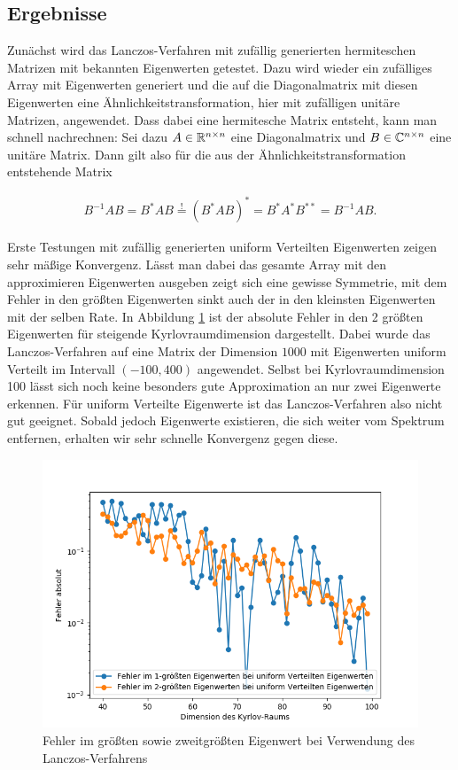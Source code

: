 \documentclass{article}
\theoremstyle{plain}
\begin{document}
\subsection{Ergebnisse}

Zunächst wird das Lanczos-Verfahren mit zufällig generierten hermiteschen Matrizen mit bekannten Eigenwerten getestet. Dazu wird wieder ein zufälliges Array mit Eigenwerten generiert und die auf die Diagonalmatrix mit diesen Eigenwerten eine Ähnlichkeitstransformation, hier mit zufälligen unitäre Matrizen, angewendet. Dass dabei eine hermitesche Matrix entsteht, kann man schnell nachrechnen: Sei dazu $A \in \mathbb{R}^{n\times n}$ eine Diagonalmatrix und $B \in \mathbb{C}^{n\times n}$ eine unitäre Matrix. Dann gilt also für die aus der Ähnlichkeitstransformation entstehende Matrix

\begin{align*}
	B^{-1}AB
	=
	B^* A B
	\stackrel{!}{=}
	(B^* A B)^*
	=
	B^* A^* B^{**}
	=
	B^{-1} A B.
\end{align*}

Erste Testungen mit zufällig generierten uniform Verteilten Eigenwerten zeigen sehr mäßige Konvergenz. Lässt man dabei das gesamte Array mit den approximieren Eigenwerten ausgeben zeigt sich eine gewisse Symmetrie, mit dem Fehler in den größten Eigenwerten sinkt auch der in den kleinsten Eigenwerten mit der selben Rate. In Abbildung \ref{error_uniform} ist der absolute Fehler in den 2 größten Eigenwerten für steigende Kyrlovraumdimension dargestellt. Dabei wurde das Lanczos-Verfahren auf eine Matrix der Dimension $1000$ mit Eigenwerten uniform Verteilt im Intervall $(-100,400)$ angewendet. Selbst bei Kyrlovraumdimension 100 lässt sich noch keine besonders gute Approximation an nur zwei Eigenwerte erkennen. Für uniform Verteilte Eigenwerte ist das Lanczos-Verfahren also nicht gut geeignet. Sobald jedoch Eigenwerte existieren, die sich weiter vom Spektrum entfernen, erhalten wir sehr schnelle Konvergenz gegen diese.

\begin{figure}[H]\label{error_uniform}
\begin{center}

	\includegraphics[width = 0.6 \linewidth]{Plots/error_uniform}
	\caption{Fehler im größten sowie zweitgrößten Eigenwert bei Verwendung des Lanczos-Verfahrens}
	\end{center}
\end{figure}
\end{document}
